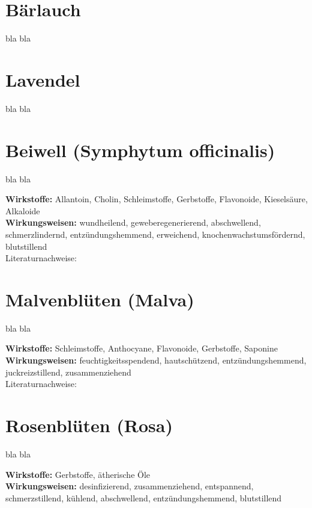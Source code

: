 \section{Bärlauch}

bla bla

\section{Lavendel}

bla bla

\section{Beiwell (Symphytum officinalis)}

bla bla

\textbf{Wirkstoffe:} Allantoin, Cholin, Schleimstoffe, Gerbstoffe, Flavonoide, Kieselsäure, Alkaloide\\

\textbf{Wirkungsweisen:} wundheilend, geweberegenerierend, abschwellend, schmerzlindernd, entzündungshemmend, erweichend, knochenwachstumsfördernd, blutstillend \\

Literaturnachweise: \cite{nedoma2018heilsalben}

\section{Malvenblüten (Malva)}

bla bla

\textbf{Wirkstoffe:} Schleimstoffe, Anthocyane, Flavonoide, Gerbstoffe, Saponine\\

\textbf{Wirkungsweisen:} feuchtigkeitsspendend, hautschützend, entzündungshemmend, juckreizstillend, zusammenziehend \\

Literaturnachweise: \cite{nedoma2018heilsalben}

\section{Rosenblüten (Rosa)}

bla bla

\textbf{Wirkstoffe:} Gerbstoffe, ätherische Öle\\

\textbf{Wirkungsweisen:} desinfizierend, zusammenziehend, entspannend, schmerzstillend, kühlend, abschwellend, entzündungshemmend, blutstillend \\

